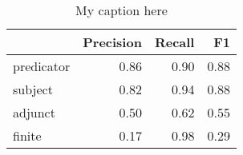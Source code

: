 \begin{table}[!ht]
\centering
\begin{tabular}{lrrr}
\toprule
{} &  Precision &  Recall &   F1 \\
\midrule
predicator &       0.86 &    0.90 & 0.88 \\
subject    &       0.82 &    0.94 & 0.88 \\
adjunct    &       0.50 &    0.62 & 0.55 \\
finite     &       0.17 &    0.98 & 0.29 \\
\bottomrule
\end{tabular}
\caption{My caption here}
\label{tab:unit-elements-mood-exact-F1}
\end{table}